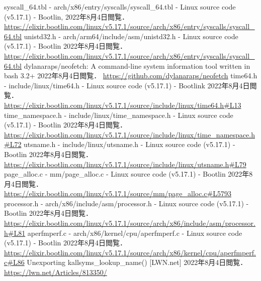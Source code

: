 \documentclass[12pt,a4paper,dvipdfmx]{jsreport}
\begin{document}








\begin{thebibliography}{9}
     syscall\_64.tbl - arch/x86/entry/syscalls/syscall\_64.tbl - Linux source code (v5.17.1) - Bootlin,
        2022年8月4日閲覧．
        \url{https://elixir.bootlin.com/linux/v5.17.1/source/arch/x86/entry/syscalls/syscall\_64.tbl}
     unistd32.h - arch/arm64/include/asm/unistd32.h - Linux source code (v5.17.1) - Bootlin
        2022年8月4日閲覧．
        \url{https://elixir.bootlin.com/linux/v5.17.1/source/arch/x86/entry/syscalls/syscall\_64.tbl}
     dylanaraps/neofetch: A command-line system information tool written in bash 3.2+
        2022年8月4日閲覧．
        \url{https://github.com/dylanaraps/neofetch}
     time64.h - include/linux/time64.h - Linux source code (v5.17.1) - Bootlink
        2022年8月4日閲覧．
        \url{https://elixir.bootlin.com/linux/v5.17.1/source/include/linux/time64.h#L13}
     time\_namespace.h - include/linux/time\_namespace.h - Linux source code (v5.17.1) - Bootlin
        2022年8月4日閲覧．
        \url{https://elixir.bootlin.com/linux/v5.17.1/source/include/linux/time\_namespace.h#L72}
     utsname.h - include/linux/utsname.h - Linux source code (v5.17.1) - Bootlin
        2022年8月4日閲覧．
        \url{https://elixir.bootlin.com/linux/v5.17.1/source/include/linux/utsname.h#L79}
     page\_alloc.c - mm/page\_alloc.c - Linux source code (v5.17.1) - Bootlin
        2022年8月4日閲覧．
        \url{https://elixir.bootlin.com/linux/v5.17.1/source/mm/page\_alloc.c#L5793}
     processor.h - arch/x86/include/asm/processor.h - Linux source code (v5.17.1) - Bootlin
        2022年8月4日閲覧．
        \url{https://elixir.bootlin.com/linux/v5.17.1/source/arch/x86/include/asm/processor.h#L81}
     aperfmperf.c - arch/x86/kernel/cpu/aperfmperf.c - Linux source code (v5.17.1) - Bootlin
        2022年8月4日閲覧．
        \url{https://elixir.bootlin.com/linux/v5.17.1/source/arch/x86/kernel/cpu/aperfmperf.c#L86}
     Unexporting kallsyms_lookup_name() [LWN.net]
        2022年8月4日閲覧．
        \url{https://lwn.net/Articles/813350/}
\end{thebibliography}
\end{document}
